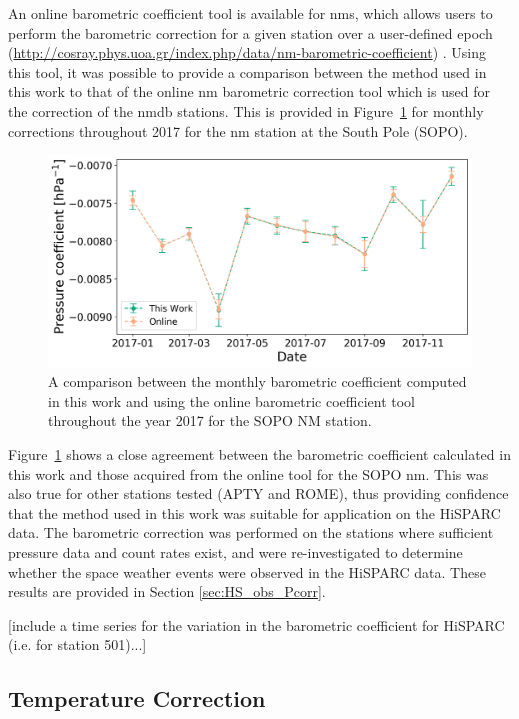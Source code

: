 An online barometric coefficient tool is available for \glspl{nm}, which allows users to perform the barometric correction for a given station over a user-defined epoch (\url{http://cosray.phys.uoa.gr/index.php/data/nm-barometric-coefficient}) \citep{paschalis_online_2013}. Using this tool, it was possible to provide a comparison between the method used in this work to that of the online \gls{nm} barometric correction tool which is used for the correction of the \gls{nmdb} stations. This is provided in Figure~\ref{fig:NM_beta_variation} for monthly corrections throughout 2017 for the \gls{nm} station at the South Pole (SOPO).

\begin{figure}[ht]
	\centering
	\includegraphics[width=0.65\columnwidth]{SOPO_beta_2017_rescale.png}
	\caption{A comparison between the monthly barometric coefficient computed in this work and using the online barometric coefficient tool throughout the year 2017 for the SOPO NM station.}
	\label{fig:NM_beta_variation}
\end{figure}


Figure~\ref{fig:NM_beta_variation} shows a close agreement between the barometric coefficient calculated in this work and those acquired from the online tool for the SOPO \gls{nm}. This was also true for other stations tested (APTY and ROME), thus providing confidence that the method used in this work was suitable for application on the HiSPARC data. The barometric correction was performed on the stations where sufficient pressure data and count rates exist, and were re-investigated to determine whether the space weather events were observed in the HiSPARC data. These results are provided in Section \ref{sec:HS_obs_Pcorr}.

[include a time series for the variation in the barometric coefficient for HiSPARC (i.e. for station 501)...]



\subsection{Temperature Correction}\label{sec:HS_T_corr}

